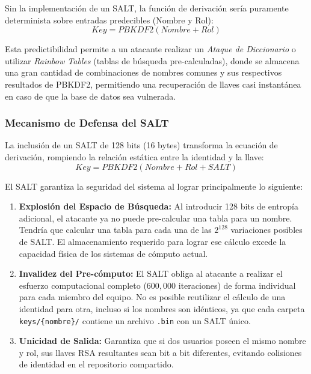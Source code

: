 \documentclass{article}
\begin{document}
Sin la implementación de un SALT, la función de derivación sería puramente determinista sobre entradas predecibles (Nombre y Rol):
\begin{equation}
    Key = PBKDF2(Nombre + Rol)
\end{equation}

Esta predictibilidad permite a un atacante realizar un \textit{Ataque de Diccionario} o utilizar \textit{Rainbow Tables} (tablas de búsqueda pre-calculadas), donde se almacena una gran cantidad de combinaciones de nombres comunes y sus respectivos resultados de PBKDF2, permitiendo una recuperación de llaves casi instantánea en caso de que la base de datos sea vulnerada.

\subsubsection{Mecanismo de Defensa del SALT}
La inclusión de un SALT de 128 bits (16 bytes) transforma la ecuación de derivación, rompiendo la relación estática entre la identidad y la llave:
\begin{equation}
    Key = PBKDF2(Nombre + Rol + SALT)
\end{equation}

El SALT garantiza la seguridad del sistema al lograr principalmente lo siguiente:

\begin{enumerate}
    \item \textbf{Explosión del Espacio de Búsqueda:} Al introducir 128 bits de entropía adicional, el atacante ya no puede pre-calcular una tabla para un nombre. Tendría que calcular una tabla para cada una de las $2^{128}$ variaciones posibles de SALT. El almacenamiento requerido para lograr ese cálculo excede la capacidad física de los sistemas de cómputo actual.

    \item \textbf{Invalidez del Pre-cómputo:} El SALT obliga al atacante a realizar el esfuerzo computacional completo ($600,000$ iteraciones) de forma individual para cada miembro del equipo. No es posible reutilizar el cálculo de una identidad para otra, incluso si los nombres son idénticos, ya que cada carpeta \texttt{keys/\{nombre\}/} contiene un archivo \texttt{.bin} con un SALT único.

    \item \textbf{Unicidad de Salida:} Garantiza que si dos usuarios poseen el mismo nombre y rol, sus llaves RSA resultantes sean bit a bit diferentes, evitando colisiones de identidad en el repositorio compartido.
\end{enumerate}
\end{document}
